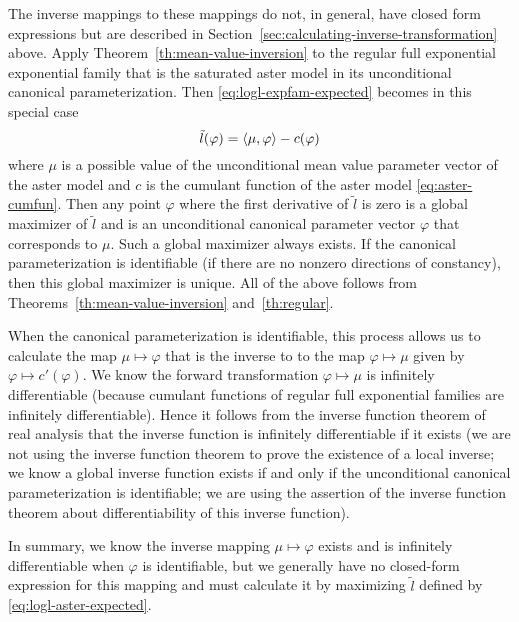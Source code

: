 The inverse mappings to these mappings do not, in general,
have closed form expressions
but are described in Section~\ref{sec:calculating-inverse-transformation}
above.  Apply Theorem~\ref{th:mean-value-inversion} to the regular
full exponential exponential family that is the saturated aster model
in its unconditional canonical parameterization.
Then \eqref{eq:logl-expfam-expected} becomes in this special case
\begin{equation} \label{eq:logl-aster-expected}
   \tilde{l}(\varphi) = \langle \mu, \varphi \rangle - c(\varphi)
\end{equation}
where $\mu$ is a possible value of the unconditional mean value parameter
vector of the aster model and $c$ is the cumulant function of the aster
model \eqref{eq:aster-cumfun}.  Then any point $\varphi$
where the first derivative of $\tilde{l}$ is zero is a global maximizer
of $\tilde{l}$ and is an unconditional canonical parameter vector $\varphi$
that corresponds to $\mu$.  Such a global maximizer always exists.
If the canonical parameterization is identifiable (if there are
no nonzero directions of constancy), then this global maximizer is unique.
All of the above follows from Theorems~\ref{th:mean-value-inversion}
and~\ref{th:regular}.

When the canonical parameterization is identifiable, this process allows
us to calculate the map $\mu \mapsto \varphi$ that is the inverse to
to the map $\varphi \mapsto \mu$ given by $\varphi \mapsto c'(\varphi)$.
We know the forward transformation $\varphi \mapsto \mu$
is infinitely differentiable (because cumulant functions of regular
full exponential families are infinitely differentiable).
Hence it follows from the inverse function theorem of real analysis
\citep[Theorem~8.27]{browder} that the inverse function is infinitely
differentiable if it exists (we are not using the inverse function theorem
to prove the existence of a local inverse; we know a global inverse function
exists if and only if the unconditional canonical parameterization
is identifiable; we are using the assertion of the inverse function theorem
about differentiability of this inverse function).

In summary, we know the inverse mapping $\mu \mapsto \varphi$ exists
and is infinitely differentiable when $\varphi$ is identifiable,
but we generally have no closed-form expression for this mapping and
must calculate it by maximizing $\tilde{l}$ defined
by \eqref{eq:logl-aster-expected}.

